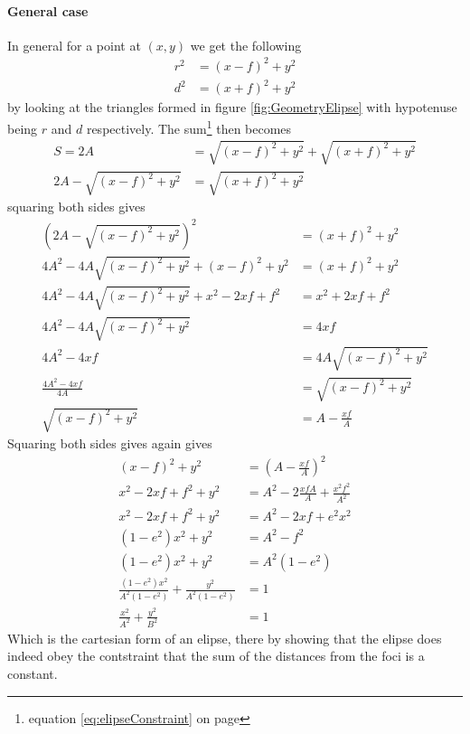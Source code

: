 \paragraph{General case}

In general for a point at $(x,y)$ we get the following
\begin{align}
r^2&=(x-f)^2+y^2\\
d^2&=(x+f)^2+y^2
\end{align}
by looking at the triangles formed in figure \ref{fig:GeometryElipse} with hypotenuse being $r$ and $d$ respectively. The sum\footnote{equation \ref{eq:elipseConstraint} on page \pageref{eq:elipseConstraint}} then becomes 
\begin{align}
S=2A&=\sqrt{(x-f)^2+y^2}+\sqrt{(x+f)^2+y^2}\nonumber \\
2A-\sqrt{(x-f)^2+y^2} &= \sqrt{(x+f)^2+y^2}
\end{align}
squaring both sides gives
\begin{align}
\left( 2A-\sqrt{(x-f)^2+y^2} \right)^2 &= (x+f)^2+y^2\nonumber \\
4A^2-4A\sqrt{(x-f)^2+y^2}+(x-f)^2+y^2  &= (x+f)^2+y^2\nonumber \\
4A^2-4A\sqrt{(x-f)^2+y^2}+x^2-2xf+f^2  &= x^2+2xf+f^2\nonumber \\
4A^2-4A\sqrt{(x-f)^2+y^2} &= 4xf\nonumber \\
4A^2-4xf &= 4A\sqrt{(x-f)^2+y^2}\nonumber \\
\frac{4A^2-4xf}{4A} &= \sqrt{(x-f)^2+y^2}\nonumber \\
\sqrt{(x-f)^2+y^2} &=A-\frac{xf}{A}
\end{align}
Squaring both sides gives again gives
\begin{align}
(x-f)^2+y^2 &=\left(A-\frac{xf}{A}\right)^2\nonumber \\
x^2-2xf+f^2+y^2 &=A^2-2\frac{xfA}{A}+\frac{x^2f^2}{A^2}\nonumber \\
x^2-2xf+f^2+y^2 &=A^2-2xf+e^2x^2\nonumber \\
(1-e^2)x^2+y^2 &=A^2-f^2\nonumber \\
(1-e^2)x^2+y^2 &=A^2(1-e^2)\nonumber \\
\frac{(1-e^2)x^2}{A^2(1-e^2)}+\frac{y^2}{A^2(1-e^2)}&=1\nonumber \\
\frac{x^2}{A^2}+\frac{y^2}{B^2}&=1 \label{eq:ElipseCartesian}
\end{align}
Which is the cartesian form of an elipse, there by showing that the elipse does indeed obey the contstraint that the sum of the distances from the foci is a constant.

